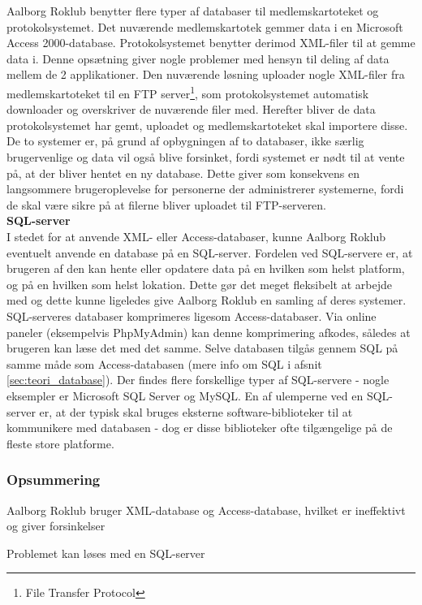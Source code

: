 Aalborg Roklub benytter flere typer af databaser til medlemskartoteket og protokolsystemet. Det nuværende medlemskartotek gemmer data i en Microsoft Access 2000-database. Protokolsystemet benytter derimod XML-filer til at gemme data i. Denne opsætning giver nogle problemer med hensyn til deling af data mellem de 2 applikationer. Den nuværende løsning uploader nogle XML-filer fra medlemskartoteket til en FTP server\footnote{File Transfer Protocol}, som protokolsystemet automatisk downloader og overskriver de nuværende filer med. Herefter bliver de data protokolsystemet har gemt, uploadet og medlemskartoteket skal importere disse.\\

De to systemer er, på grund af opbygningen af to databaser, ikke særlig brugervenlige og data vil også blive forsinket, fordi systemet er nødt til at vente på, at der bliver hentet en ny database. Dette giver som konsekvens en langsommere brugeroplevelse for personerne der administrerer systemerne, fordi de skal være sikre på at filerne bliver uploadet til FTP-serveren.\\

{\bf{SQL-server}}\\
I stedet for at anvende XML- eller Access-databaser, kunne Aalborg Roklub eventuelt anvende en database på en SQL-server. Fordelen ved SQL-servere er, at brugeren af den kan hente eller opdatere data på en hvilken som helst platform, og på en hvilken som helst lokation. Dette gør det meget fleksibelt at arbejde med og dette kunne ligeledes give Aalborg Roklub en samling af deres systemer. SQL-serveres databaser komprimeres ligesom Access-databaser. Via online paneler (eksempelvis PhpMyAdmin) kan denne komprimering afkodes, således at brugeren kan læse det med det samme. Selve databasen tilgås gennem SQL på samme måde som Access-databasen (mere info om SQL i afsnit \ref{sec:teori_database}). Der findes flere forskellige typer af SQL-servere - nogle eksempler er Microsoft SQL Server og MySQL. En af ulemperne ved en SQL-server er, at der typisk skal bruges eksterne software-biblioteker til at kommunikere med databasen - dog er disse biblioteker ofte tilgængelige på de fleste store platforme.

\subsubsection*{Opsummering}
\begin{itemize_small}
    \item Aalborg Roklub bruger XML-database og Access-database, hvilket er ineffektivt og giver forsinkelser
    \item Problemet kan løses med en SQL-server
\end{itemize_small}
